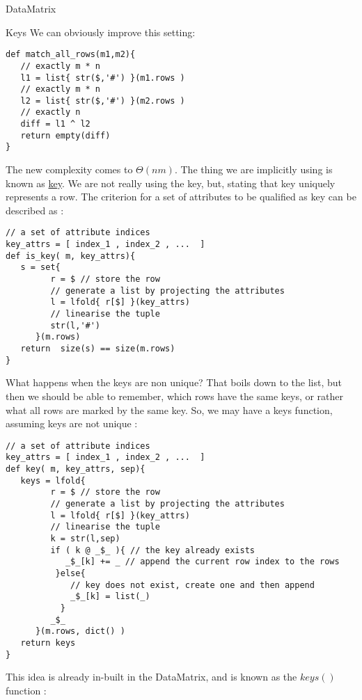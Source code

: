 \begin{section}{DataMatrix}
\begin{subsection}{Keys}
We can obviously improve this setting: 

\begin{lstlisting}[style=JexlStyle]
def match_all_rows(m1,m2){
   // exactly m * n 
   l1 = list{ str($,'#') }(m1.rows )
   // exactly m * n
   l2 = list{ str($,'#') }(m2.rows )
   // exactly n
   diff = l1 ^ l2
   return empty(diff)  
}
\end{lstlisting}

The new complexity comes to $\Theta(nm)$.
The thing we are implicitly using is known as \href{https://en.wikipedia.org/wiki/Unique\_key}{key}.
We are not really using the key, but, stating that key uniquely represents a row. The criterion 
for a set of attributes to be qualified as key can be described as : 

\begin{lstlisting}[style=JexlStyle]
// a set of attribute indices 
key_attrs = [ index_1 , index_2 , ...  ]
def is_key( m, key_attrs){
   s = set{  
         r = $ // store the row
         // generate a list by projecting the attributes 
         l = lfold{ r[$] }(key_attrs)
         // linearise the tuple 
         str(l,'#')   
      }(m.rows)
   return  size(s) == size(m.rows)
}
\end{lstlisting}

What happens when the keys are non unique? That boils down to the list, 
but then we should be able to remember, which rows have the same keys,
or rather what all rows are marked by the same key.
So, we may have a keys function, assuming keys are not unique : 

\begin{lstlisting}[style=JexlStyle]
// a set of attribute indices 
key_attrs = [ index_1 , index_2 , ...  ]
def key( m, key_attrs, sep){
   keys = lfold{  
         r = $ // store the row
         // generate a list by projecting the attributes 
         l = lfold{ r[$] }(key_attrs)
         // linearise the tuple 
         k = str(l,sep)
         if ( k @ _$_ ){ // the key already exists 
            _$_[k] += _ // append the current row index to the rows
          }else{
             // key does not exist, create one and then append 
             _$_[k] = list(_) 
           }
         _$_    
      }(m.rows, dict() )
   return keys
}
\end{lstlisting}

This idea is already in-built in the DataMatrix, and is known as the $keys()$ function :


\end{subsection}
\end{section}
